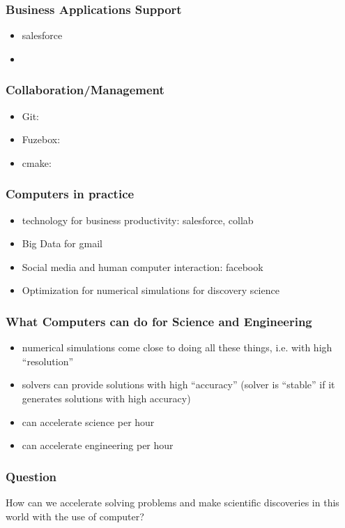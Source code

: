 \begin{frame}
\frametitle{ Business Applications Support }
\begin{itemize}
\item salesforce
\item
\end{itemize}
\end{frame}

\begin{frame}
\frametitle{Collaboration/Management}
\begin{itemize}
\item Git:
\item Fuzebox:
\item cmake:
\end{itemize}
\end{frame}





\begin{frame}
\frametitle{Computers in practice}
\begin{itemize}
\item technology for business productivity:  salesforce, collab
\item Big Data for gmail
\item Social media and human computer interaction: facebook
\item Optimization for numerical simulations for discovery science
\end{itemize}
\end{frame}


\begin{frame}
\frametitle{What Computers can do for Science and Engineering}
\begin{itemize}
\item numerical simulations come close to doing all these things, i.e. with high ``resolution''
\item solvers can provide solutions with high ``accuracy'' (solver is ``stable'' if it generates solutions with high accuracy)
\item can accelerate science per hour
\item can accelerate engineering per hour
\end{itemize}
\end{frame}

\begin{frame}
\frametitle{Question}
How can we accelerate solving problems and make scientific discoveries in this world with the use of computer?

\end{frame}

